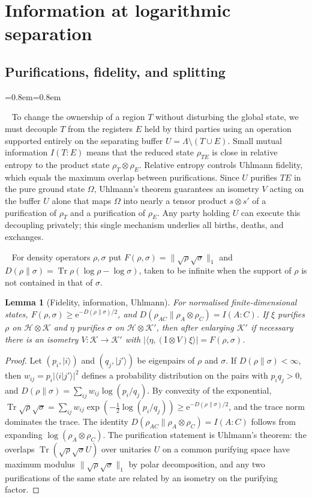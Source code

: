 \documentclass[aps,prx,reprint,superscriptaddress,floatfix,nofootinbib,longbibliography,amsmath,amssymb]{revtex4-2}
\newcommand{\id}{\mathrm{I}}
\newcommand{\Tr}{\operatorname{Tr}}
\newcommand{\norm}[1]{\lVert #1\rVert}
\newcommand{\abs}[1]{\lvert #1\rvert}
\providecommand{\ket}[1]{|#1\rangle}\renewcommand{\ket}[1]{|#1\rangle}
\newcommand{\cH}{\mathcal H}
\newcommand{\cK}{\mathcal K}
\newcommand{\Om}{\Omega}
\newcommand{\Lam}{\Lambda}
\newcommand{\e}{\mathrm e}
\theoremstyle{plain}
\newtheorem{lemma}[theorem]{Lemma}
\theoremstyle{definition}
\newenvironment{inwords}{%
  \par\medskip\noindent
  \begin{list}{}{\leftmargin=0.8em\rightmargin=0.8em}
  \item\relax
  \noindent{\sffamily\bfseries\color{blue!40!black}In words.}\ \sffamily\small}{%
  \end{list}\par\medskip}
\newcommand{\precisely}{\par\noindent{\bfseries Precisely.}\ }
\begin{document}
\section{Information at logarithmic separation}\label{sec:logsep}

\subsection{Purifications, fidelity, and splitting}

\begin{inwords}
To change the ownership of a region $T$ without disturbing the global state,
we must decouple $T$ from the registers $E$ held by third parties using an
operation supported entirely on the separating buffer $U=\Lam\setminus(T\cup E)$.
Small mutual information $I(T:E)$ means that the reduced state $\rho_{TE}$
is close in relative entropy to the product state $\rho_T\otimes\rho_E$.
Relative entropy controls Uhlmann fidelity, which equals the maximum overlap
between purifications. Since $U$ purifies $TE$ in the pure ground state
$\Om$, Uhlmann's theorem guarantees an isometry $V$ acting on the buffer
$U$ alone that maps $\Om$ into nearly a tensor product $s\otimes s'$ of a
purification of $\rho_T$ and a purification of $\rho_E$. Any party holding
$U$ can execute this decoupling privately; this single mechanism underlies
all births, deaths, and exchanges.
\end{inwords}

\precisely
For density operators $\rho,\sigma$ put $F(\rho,\sigma)=\norm{\sqrt\rho\sqrt\sigma}_1$
and $D(\rho\|\sigma)=\Tr\rho(\log\rho-\log\sigma)$, taken to be infinite
when the support of $\rho$ is not contained in that of $\sigma$.

\begin{lemma}[Fidelity, information, Uhlmann]\label{lem:fidelity}
For normalised finite-dimensional states, $F(\rho,\sigma)\ge\e^{-D(\rho\|\sigma)/2}$,
and $D(\rho_{AC}\|\rho_A\otimes\rho_C)=I(A:C)$. If $\xi$ purifies $\rho$ on
$\cH\otimes\cK$ and $\eta$ purifies $\sigma$ on $\cH\otimes\cK'$, then after
enlarging $\cK'$ if necessary there is an isometry $V:\cK\to\cK'$ with
$\abs{\langle\eta,(\id\otimes V)\xi\rangle}=F(\rho,\sigma)$.
\end{lemma}
\begin{proof}
Let $(p_i,\ket i)$ and $(q_j,\ket{j'})$ be eigenpairs of $\rho$ and $\sigma$.
If $D(\rho\|\sigma)<\infty$, then $w_{ij}=p_i\abs{\langle i|j'\rangle}^2$ defines
a probability distribution on the pairs with $p_iq_j>0$, and
$D(\rho\|\sigma)=\sum_{ij}w_{ij}\log(p_i/q_j)$. By convexity of the exponential,
$\Tr\sqrt\rho\sqrt\sigma=\sum_{ij}w_{ij}\exp(-\tfrac12\log(p_i/q_j))\ge\e^{-D(\rho\|\sigma)/2}$,
and the trace norm dominates the trace. The identity
$D(\rho_{AC}\|\rho_A\otimes\rho_C)=I(A:C)$ follows from expanding
$\log(\rho_A\otimes\rho_C)$. The purification statement is Uhlmann's
theorem: the overlaps $\Tr(\sqrt\rho\sqrt\sigma U)$ over unitaries $U$ on a
common purifying space have maximum modulus $\norm{\sqrt\rho\sqrt\sigma}_1$
by polar decomposition, and any two purifications of the same state are
related by an isometry on the purifying factor.
\end{proof}
\end{document}
